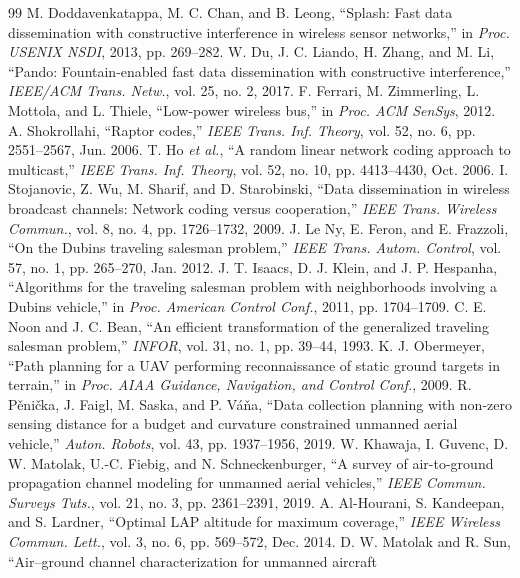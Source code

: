\begin{thebibliography}{99}
 M. Doddavenkatappa, M. C. Chan, and B. Leong, ``Splash: Fast data dissemination with
constructive interference in wireless sensor networks,'' in \emph{Proc. USENIX NSDI}, 2013, pp. 269--282.
 W. Du, J. C. Liando, H. Zhang, and M. Li, ``Pando: Fountain-enabled fast data dissemination with
constructive interference,'' \emph{IEEE/ACM Trans. Netw.}, vol. 25, no. 2, 2017.
 F. Ferrari, M. Zimmerling, L. Mottola, and L. Thiele, ``Low-power wireless bus,'' in \emph{Proc.
ACM SenSys}, 2012.
 A. Shokrollahi, ``Raptor codes,'' \emph{IEEE Trans. Inf. Theory}, vol. 52, no. 6,
pp. 2551--2567, Jun. 2006.
 T. Ho \emph{et al.}, ``A random linear network coding approach to multicast,'' \emph{IEEE Trans. Inf.
Theory}, vol. 52, no. 10, pp. 4413--4430, Oct. 2006.
 I. Stojanovic, Z. Wu, M. Sharif, and D. Starobinski, ``Data dissemination in wireless broadcast
channels: Network coding versus cooperation,'' \emph{IEEE Trans. Wireless Commun.}, vol. 8, no. 4, pp. 1726--1732, 2009.
 J. Le Ny, E. Feron, and E. Frazzoli, ``On the Dubins traveling salesman problem,'' \emph{IEEE Trans.
Autom. Control}, vol. 57, no. 1, pp. 265--270, Jan. 2012.
 J. T. Isaacs, D. J. Klein, and J. P. Hespanha, ``Algorithms for the traveling salesman problem with
neighborhoods involving a Dubins vehicle,'' in \emph{Proc. American Control Conf.}, 2011, pp. 1704--1709.
 C. E. Noon and J. C. Bean, ``An efficient transformation of the generalized traveling salesman
problem,'' \emph{INFOR}, vol. 31, no. 1, pp. 39--44, 1993.
 K. J. Obermeyer, ``Path planning for a UAV performing reconnaissance of static ground targets in
terrain,'' in \emph{Proc. AIAA Guidance, Navigation, and Control Conf.}, 2009.
 R. P\v{e}ni\v{c}ka, J. Faigl, M. Saska, and P. V\'a\v{n}a, ``Data collection planning with
non-zero sensing distance for a budget and curvature constrained unmanned aerial vehicle,'' \emph{Auton. Robots},
vol. 43, pp. 1937--1956, 2019.
 W. Khawaja, I. Guvenc, D. W. Matolak, U.-C. Fiebig, and N. Schneckenburger, ``A survey of
air-to-ground propagation channel modeling for unmanned aerial vehicles,'' \emph{IEEE Commun. Surveys Tuts.}, vol. 21,
no. 3, pp. 2361--2391, 2019.
 A. Al-Hourani, S. Kandeepan, and S. Lardner, ``Optimal LAP altitude for maximum coverage,''
\emph{IEEE Wireless Commun. Lett.}, vol. 3, no. 6, pp. 569--572, Dec. 2014.
 D. W. Matolak and R. Sun, ``Air--ground channel characterization for unmanned aircraft

\end{thebibliography}

